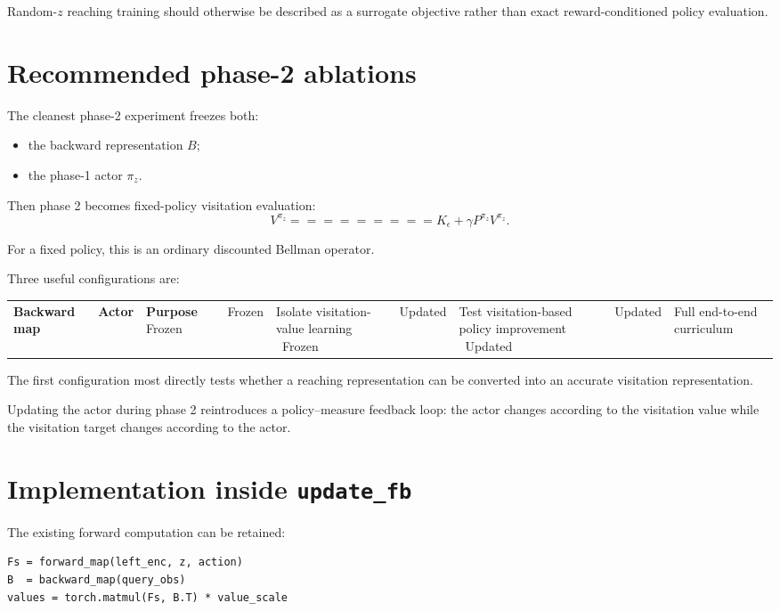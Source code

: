 \documentclass[10pt]{article}
\begin{document}
Random-$z$ reaching training should otherwise be described as a surrogate objective rather
than exact reward-conditioned policy evaluation.

\section{Recommended phase-2 ablations}

The cleanest phase-2 experiment freezes both:
\begin{itemize}
\item the backward representation $B$;
\item the phase-1 actor $\pi_z$.
\end{itemize}

Then phase 2 becomes fixed-policy visitation evaluation:
\begin{equation}
V^{\pi_z}
=========

K_\epsilon
+
\gamma P^{\pi_z}V^{\pi_z}.
\end{equation}

For a fixed policy, this is an ordinary discounted Bellman operator.

Three useful configurations are:
\begin{center}
\begin{tabular}{lll}
\toprule
\textbf{Backward map} & \textbf{Actor} & \textbf{Purpose} \
\midrule
Frozen & Frozen & Isolate visitation-value learning \
Frozen & Updated & Test visitation-based policy improvement \
Updated & Updated & Full end-to-end curriculum \
\bottomrule
\end{tabular}
\end{center}

The first configuration most directly tests whether a reaching representation can be
converted into an accurate visitation representation.

Updating the actor during phase 2 reintroduces a policy--measure feedback loop:
the actor changes according to the visitation value while the visitation target changes
according to the actor.

\section{Implementation inside \texttt{update_fb}}

The existing forward computation can be retained:
\begin{verbatim}
Fs = forward_map(left_enc, z, action)
B  = backward_map(query_obs)
values = torch.matmul(Fs, B.T) * value_scale
\end{verbatim}
\end{document}
